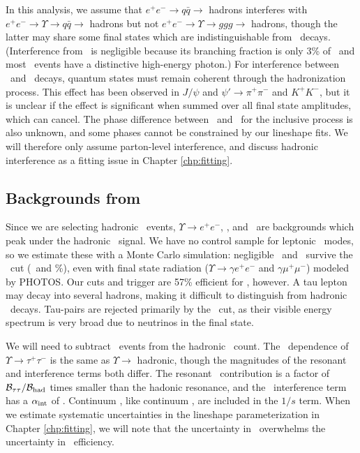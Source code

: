\documentclass{cornell}
\begin{document}
In this analysis, we assume that $e^+e^- \to q\bar{q} \to$ hadrons
interferes with $e^+e^- \to \Upsilon \to q\bar{q} \to$ hadrons but not
$e^+e^- \to \Upsilon \to ggg \to$ hadrons, though the latter may share
some final states which are indistinguishable from \qqbar\ decays.
(Interference from \gggamma\ is negligible because its branching
fraction is only 3\% of \ggg\ and most \gggamma\ events have a
distinctive high-energy photon.)  For interference between \qqbar\ and
\ggg\ decays, quantum states must remain coherent through the
hadronization process.  This effect has been observed in $J/\psi$ and
$\psi' \to \pi^+\pi^-$ and $K^+K^-$, but it is unclear if the effect
is significant when summed over all final state amplitudes, which can
cancel.  The phase difference between \qqbar\ and \ggg\ for the
inclusive process is also unknown, and some phases cannot be
constrained by our lineshape fits.  We will therefore only assume
parton-level interference, and discuss hadronic interference as a
fitting issue in Chapter \ref{chp:fitting}.

\subsection{Backgrounds from \boldmath \ups}

Since we are selecting hadronic \ups\ events, $\Upsilon \to e^+e^-$,
\mumu, and \tautau\ are backgrounds which peak under the hadronic
\ups\ signal.  We have no control sample for leptonic \ups\ modes, so
we estimate these with a Monte Carlo simulation: negligible \ee\ and
\mumu\ survive the \pmax\ cut (\bork\ and \bork\%), even with final
state radiation ($\Upsilon \to \gamma e^+e^-$ and $\gamma \mu^+\mu^-$)
modeled by PHOTOS.  Our cuts and trigger are 57\% efficient for
\tautau, however.  A tau lepton may decay into several hadrons, making
it difficult to distinguish from hadronic \ups\ decays.  Tau-pairs are
rejected primarily by the \visen\ cut, as their visible energy
spectrum is very broad due to neutrinos in the final state.

We will need to subtract \tautau\ events from the hadronic \ups\
count.  The \ecm\ dependence of $\Upsilon \to \tau^+\tau^-$ is the
same as $\Upsilon \to$ hadronic, though the magnitudes of the resonant
and interference terms both differ.  The resonant \tautau\
contribution is a factor of ${\mathcal B}_{\tau\tau}/{\mathcal
B}_{\mbox{\scriptsize had}}$ times smaller than the hadonic resonance, and the
\tautau\ interference term has a $\alpha_{\mbox{\scriptsize int}}$ of \bork.  Continuum
\tautau, like continuum \qqbar, are included in the $1/s$ term.  When
we estimate systematic uncertainties in the lineshape parameterization
in Chapter \ref{chp:fitting}, we will note that the uncertainty in
\btt\ overwhelms the uncertainty in \tautau\ efficiency.
\end{document}
